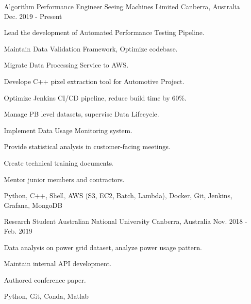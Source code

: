 

\begin{cventries}

  \cventry
    {Algorithm Performance Engineer} %
    {Seeing Machines Limited} %
    {Canberra, Australia} %
    {Dec. 2019 - Present} %
    {
      \begin{cvitems} %
        \item {Lead the development of Automated Performance Testing Pipeline.}
        \item {Maintain Data Validation Framework, Optimize codebase.}
        \item {Migrate Data Processing Service to AWS.}
        \item {Develope C++ pixel extraction tool for Automotive Project.}
        \item {Optimize Jenkins CI/CD pipeline, reduce build time by 60\%.}
        \item {Manage PB level datasets, supervise Data Lifecycle.}
        \item {Implement Data Usage Monitoring system.}
        \item {Provide statistical analysis in customer-facing meetings.}
        \item {Create technical training documents.}
        \item {Mentor junior members and contractors.}
        \item {Python, C++, Shell, AWS (S3, EC2, Batch, Lambda), Docker, Git, Jenkins, Grafana, MongoDB}
      \end{cvitems}
    }

  \cventry
    {Research Student} %
    {Australian National University} %
    {Canberra, Australia} %
    {Nov. 2018 - Feb. 2019} %
    {
      \begin{cvitems}
        \item {Data analysis on power grid dataset, analyze power usage pattern.}
        \item {Maintain internal API development.}
        \item {Authored conference paper.}
        \item {Python, Git, Conda, Matlab}
      \end{cvitems}
    }


\end{cventries}
